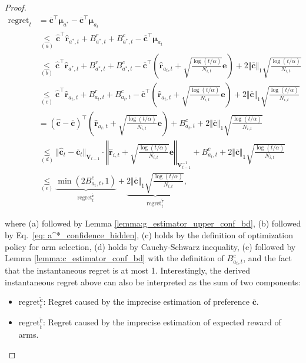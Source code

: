 \begin{proof}
\[
\begin{aligned}
\text{regret}_{t} 
& = \boldsymbol{\overline{c}}^{\top}  \boldsymbol{\mu}_{a^*} - \boldsymbol{\overline{c}}^{\top}  \boldsymbol{\mu}_{a_t} \\
& \underset{(a)}{\leq}
\boldsymbol{\hat{c}}^{\top} \boldsymbol{\hat{r}}_{a^*,t} + B_{a^*,t}^{r} + B_{a^*,t}^{c} - \boldsymbol{\overline{c}}^{\top}  \boldsymbol{\mu}_{a_t} \\
& \underset{(b)}{\leq}
\boldsymbol{\hat{c}}^{\top} \boldsymbol{\hat{r}}_{a^*,t} + B_{a^*,t}^{r} + B_{a^*,t}^{c} - \boldsymbol{\overline{c}}^{\top} \left( \boldsymbol{\hat{r}}_{a_t,t} + \sqrt{\frac{ \log(t/\alpha)}{N_{i,t}}} \boldsymbol{e} \right) + 2\Vert\boldsymbol{\overline{c}}\Vert_1 \sqrt{\frac{ \log(t/\alpha)}{N_{i,t}}} \\
& \underset{(c)}{\leq}
\boldsymbol{\hat{c}}^{\top} \boldsymbol{\hat{r}}_{a_t,t} + B_{a_t,t}^{r} + B_{a_t,t}^{c} - \boldsymbol{\overline{c}}^{\top} \left( \boldsymbol{\hat{r}}_{a_t,t} + \sqrt{\frac{ \log(t/\alpha)}{N_{i,t}}} \boldsymbol{e} \right) + 2\Vert\boldsymbol{\overline{c}}\Vert_1 \sqrt{\frac{ \log(t/\alpha)}{N_{i,t}}}  \\
& = 
(\boldsymbol{\hat{c}} - \boldsymbol{\overline{c}})^{\top} \left( \boldsymbol{\hat{r}}_{a_t,t} + \sqrt{\frac{ \log(t/\alpha)}{N_{i,t}}} \boldsymbol{e} \right) + B_{a_t,t}^{c} + 2\Vert\boldsymbol{\overline{c}}\Vert_1 \sqrt{\frac{ \log(t/\alpha)}{N_{i,t}}} \\
& \underset{(d)}{\leq}
\Vert \boldsymbol{\hat{c}}_t - \boldsymbol{\overline{c}}_t \Vert_{\boldsymbol{V}_{t-1}} \cdot \left \Vert \boldsymbol{\hat{r}}_{i,t} + \sqrt{\frac{ \log(t/\alpha)}{N_{i,t}}} \boldsymbol{e} \right \Vert_{\boldsymbol{V}_{t-1}^{-1}} + B_{a_t,t}^{c} + 2\Vert\boldsymbol{\overline{c}}\Vert_1 \sqrt{\frac{ \log(t/\alpha)}{N_{i,t}}} \\
& \underset{(e)}{\leq}
\underbrace{
\min \left( 2 B_{a_t,t}^{c}, 1 \right)
}_{\text{regret}_{t}^{\tilde{\boldsymbol{c}}}} 
+ 
\underbrace{
2 \Vert\boldsymbol{\overline{c}}\Vert_1 \sqrt{\frac{ \log(t/\alpha)}{N_{i,t}}} 
}_{\text{regret}_{t}^{\tilde{\boldsymbol{r}}}},
\end{aligned}
\]

where (a) followed by Lemma \ref{lemma:g_estimator_upper_conf_bd}, (b) followed by Eq.~\ref{eq: a^*_confidence_hidden}, (c) holds by the definition of optimization policy for arm selection, (d) holds by Cauchy-Schwarz inequality, (e) followed by Lemma \ref{lemma:c_estimator_conf_bd} with the definition of $B_{a_t,t}^{c}$, and the fact that the instantaneous regret is at most 1.
Interestingly, the derived instantaneous regret above can also be interpreted as the sum of two components: 
\begin{itemize}
  \item $\text{regret}_{t}^{\tilde{\boldsymbol{c}}}$: Regret caused by the imprecise estimation of preference $\boldsymbol{\overline{c}}$.
  \item $\text{regret}_{t}^{\tilde{\boldsymbol{r}}}$: Regret caused by the imprecise estimation of expected reward of arms.
\end{itemize}


\end{proof}
